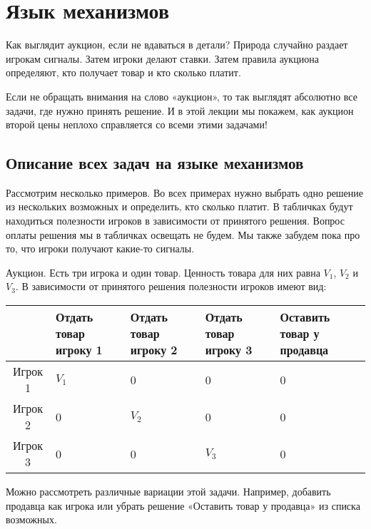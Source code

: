 \chapter{Язык механизмов}
Как выглядит аукцион, если не вдаваться в детали? Природа случайно раздает игрокам сигналы. Затем игроки делают ставки. Затем правила аукциона определяют, кто получает товар и кто сколько платит.

Если не обращать внимания на слово «аукцион», то так выглядят абсолютно все задачи, где нужно принять решение. И в этой лекции мы покажем, как аукцион второй цены неплохо справляется со всеми этими задачами!





\section{Описание всех задач на языке механизмов}

Рассмотрим несколько примеров. Во всех примерах нужно выбрать одно решение из нескольких возможных и определить, кто сколько платит. В табличках будут находиться полезности игроков в зависимости от принятого решения. Вопрос оплаты решения мы в табличках освещать не будем. Мы также забудем пока про то, что игроки получают какие-то сигналы.


\begin{myex} Аукцион. Есть три игрока и один товар. Ценность товара для них равна $ V_{1} $, $ V_{2} $ и $ V_{3} $. В зависимости от принятого решения полезности игроков имеют вид:

\begin{tabular}{c|p{2.2 cm}p{2.2 cm}p{2.2 cm}p{2.2 cm}}
& Отдать товар игроку 1 & Отдать товар игроку 2 & Отдать товар игроку 3 & Оставить товар у продавца \\
\hline
Игрок 1 & $ V_{1} $ & 0 & 0 & 0\\
Игрок 2 & 0 & $ V_{2} $ & 0 & 0\\
Игрок 3 & 0 & 0 & $ V_{3} $ & 0\\
\end{tabular}

Можно рассмотреть различные вариации этой задачи. Например, добавить продавца как игрока или убрать решение «Оставить товар у продавца» из списка возможных.

\end{myex}


